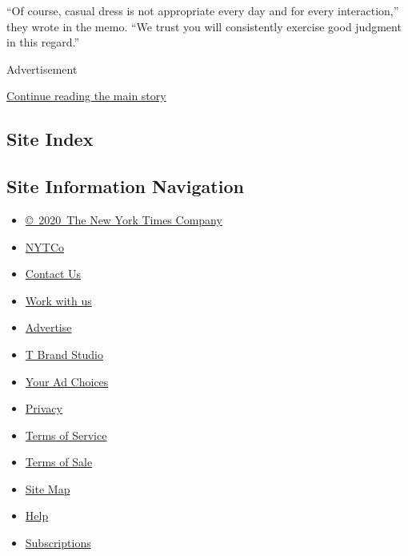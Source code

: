 ``Of course, casual dress is not appropriate every day and for every
interaction,'' they wrote in the memo. ``We trust you will consistently
exercise good judgment in this regard.''

Advertisement

\protect\hyperlink{after-bottom}{Continue reading the main story}

\hypertarget{site-index}{%
\subsection{Site Index}\label{site-index}}

\hypertarget{site-information-navigation}{%
\subsection{Site Information
Navigation}\label{site-information-navigation}}

\begin{itemize}
\tightlist
\item
  \href{https://help.nytimes3xbfgragh.onion/hc/en-us/articles/115014792127-Copyright-notice}{©~2020~The
  New York Times Company}
\end{itemize}

\begin{itemize}
\tightlist
\item
  \href{https://www.nytco.com/}{NYTCo}
\item
  \href{https://help.nytimes3xbfgragh.onion/hc/en-us/articles/115015385887-Contact-Us}{Contact
  Us}
\item
  \href{https://www.nytco.com/careers/}{Work with us}
\item
  \href{https://nytmediakit.com/}{Advertise}
\item
  \href{http://www.tbrandstudio.com/}{T Brand Studio}
\item
  \href{https://www.nytimes3xbfgragh.onion/privacy/cookie-policy\#how-do-i-manage-trackers}{Your
  Ad Choices}
\item
  \href{https://www.nytimes3xbfgragh.onion/privacy}{Privacy}
\item
  \href{https://help.nytimes3xbfgragh.onion/hc/en-us/articles/115014893428-Terms-of-service}{Terms
  of Service}
\item
  \href{https://help.nytimes3xbfgragh.onion/hc/en-us/articles/115014893968-Terms-of-sale}{Terms
  of Sale}
\item
  \href{https://spiderbites.nytimes3xbfgragh.onion}{Site Map}
\item
  \href{https://help.nytimes3xbfgragh.onion/hc/en-us}{Help}
\item
  \href{https://www.nytimes3xbfgragh.onion/subscription?campaignId=37WXW}{Subscriptions}
\end{itemize}
